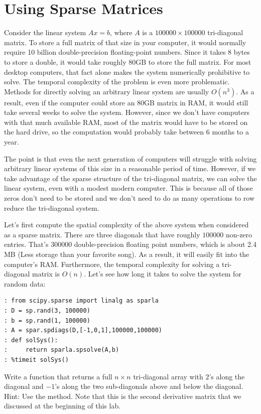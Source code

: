 \section*{Using Sparse Matrices}
Consider the linear system $A x = b$, where $A$ is a $100000\times 100000$ tri-diagonal matrix. 
To store a full matrix of that size in your computer, it would normally require 10
billion double-precision floating-point numbers.  Since it takes 8
bytes to store a double, it would take roughly 80GB to store the
full matrix.  For most desktop computers, that fact alone makes the
system numerically prohibitive to solve. 
The temporal complexity of the problem is even more problematic. 
Methods for directly solving an arbitrary linear system are usually $O(n^3)$.  
As a result, even if the computer could store an 80GB matrix in RAM, it
would still take several weeks to solve the system.  However, since
we don't have computers with that much available RAM, most of the
matrix would have to be stored on the hard drive, so the computation
would probably take between $6$ months to a year.

The point is that even the next generation of computers will
struggle with solving arbitrary linear systems of this size in a
reasonable period of time.  However, if we take advantage of the
sparse structure of the tri-diagonal matrix, we can solve the linear
system, even with a modest modern computer.  This is because all of
those zeros don't need to be stored and we don't need to do as many
operations to row reduce the tri-diagonal system.

Let's first compute the spatial complexity of the above system when
considered as a sparse matrix.  There are three diagonals that have
roughly $100000$ non-zero entries.  That's $300000$
double-precision floating point numbers, which is about 2.4 MB (Less
storage than your favorite song).  As a result, it will easily
fit into the computer's RAM.  Furthermore, the temporal complexity for solving
a tri-diagonal matrix is $O(n)$. Let's see how long it takes to
solve the system for random data:
\begin{lstlisting}
: from scipy.sparse import linalg as sparla
: D = sp.rand(3, 100000)
: b = sp.rand(1, 100000)
: A = spar.spdiags(D,[-1,0,1],100000,100000)
: def solSys():
:     return sparla.spsolve(A,b)
: %timeit solSys()
\end{lstlisting}

\begin{problem}
Write a function that returns a full $n\times n$
tri-diagonal array with $2$'s along the diagonal and $-1$'s along
the two sub-diagonals above and below the diagonal. 
Hint: Use the  method. 
Note that this is the second derivative matrix that we discussed at the beginning of this lab.
\end{problem}

